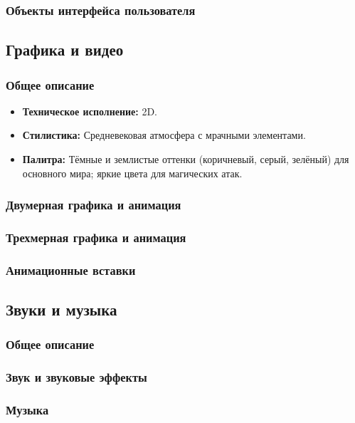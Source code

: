 \documentclass{article}
\begin{document}
\subsubsection{Объекты интерфейса пользователя}

\subsection{Графика и видео}

\subsubsection{Общее описание}
\begin{itemize}
    \item \textbf{Техническое исполнение:} 2D.
    \item \textbf{Стилистика:} Средневековая атмосфера с мрачными элементами.
    \item \textbf{Палитра:} Тёмные и землистые оттенки (коричневый, серый, зелёный) для основного мира; яркие цвета для магических атак.
\end{itemize}
\subsubsection{Двумерная графика и анимация}
\subsubsection{Трехмерная графика и анимация}
\subsubsection{Анимационные вставки}

\subsection{Звуки и музыка}
\subsubsection{Общее описание}
\subsubsection{Звук и звуковые эффекты}
\subsubsection{Музыка}
\end{document}
